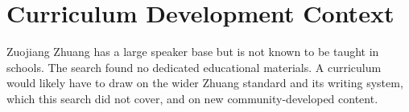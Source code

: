 \documentclass[12pt]{article}
\begin{document}
\section{Curriculum Development Context}
Zuojiang Zhuang has a large speaker base but is not known to be taught in schools. The search found no dedicated educational materials. A curriculum would likely have to draw on the wider Zhuang standard and its writing system, which this search did not cover, and on new community-developed content.
\end{document}
